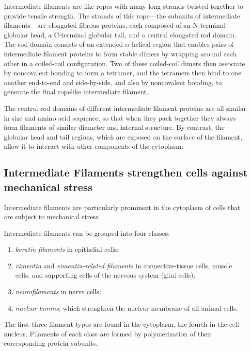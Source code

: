 Intermediate filaments are like ropes with many long strands twisted
together to provide tensile strength. The strands of this
rope—the subunits of intermediate filaments - are elongated fibrous
proteins, each composed of an N-terminal globular head, a C-terminal
globular tail, and a central elongated rod domain. The
rod domain consists of an extended $\alpha$-helical region that enables pairs of
intermediate filament proteins to form stable dimers by wrapping around
each other in a coiled-coil configuration. Two of these coiled-coil dimers
then associate by noncovalent bonding to form a tetramer, and the tetramers then
bind to one another end-to-end and side-by-side, and also by noncovalent
bonding, to generate the final ropelike intermediate filament.

The central rod domains of different intermediate filament proteins are all
similar in size and amino acid sequence, so that when they pack together
they always form filaments of similar diameter and internal structure. By
contrast, the globular head and tail regions, which are exposed on the
surface of the filament, allow it to interact with other components of the
cytoplasm.

\subsection{Intermediate Filaments strengthen cells against mechanical stress}

Intermediate filaments are particularly prominent in the cytoplasm of cells
that are subject to mechanical stress.

Intermediate filaments can be grouped into four classes:

\begin{enumerate}
\item \textit{keratin filaments} in epithelial cells;
\item \textit{vimentin} and \textit{vimentin-related filaments} in
connective-tissue cells, muscle cells, and supporting cells of the nervous
system (glial cells);
\item \textit{neurofilaments} in nerve cells;
\item \textit{nuclear lamins}, which strengthen the nuclear membrane of all animal cells.
\end{enumerate}

The first three filament types are found in the cytoplasm, the fourth
in the cell nucleus. Filaments of each class are formed by polymerization
of their corresponding protein subunits.


